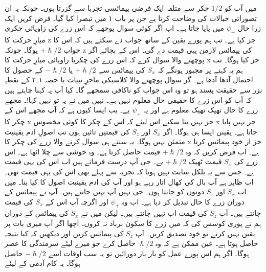 
میں آپ کو 
$1/2$
چکر سے متلقہ ایک فرضی پیمائسی تجربا سے گزرتا ہوں۔ چونکہ یہ ان تصوراتی خیالات کی وضاحت کرتا یے جن پر باب ۱ میں تبصرا کیا گیا۔ فرض کریں ایک زرا حال
$\psi_+$
 میں پایا جاتا ہے۔ اب اگر کوئی سوال پوچھے کہ اس زرے کی زاویائی چکری میارِ حرکت کا 
 z
 جز کیا ہے۔ تب ہم پورے یقین کے ساتھ جواب دے سکتے ہیں کہ اس کا جواب   
 $+\hslash/2$
 یوگا۔ چونکہ 
 z
 کی پیمائس لازمن یہی قیمت دے گی۔ اس کے بجائے اگر پوچھنے والا سوال کرے کہ اس زرے کی چکریا زاویائی میارِ حرکت کا
 x
 جز کیا ہوگا۔ تب ہم یہ کہنے پر مجبور یونگے کہ 
 $S_x$
 کی پیمائس سے 
 $+\hslash/2$
  یا
  $-\hslash/2$
کے حصول کا احتمال آدھا آدھا ہے۔ گر  سوال پوچھنے والا کلاسیکی ماحرِ تبیات یا حصہ ۱۔۲ کے نقطہِ نزر سے حقیقت پسند ہو تو وہ اس جواب کو ناکافی سمجھے گا۔ کیا آپ یہ کہنا چاہتے ہیں کہ آپ کو اس زرے کا حقیقی حال معلوم نہیں ہے۔ نہیں میں نے یہ تو نہیں کہا!۔ مجھے زرے کا حال تھیک تھیک معلوم ہے اور یہ 
$\psi_+$
یے۔ یب ایسا کیوں ہے کہ آپ مجھے اس کے چکر کا 
x
جز نہیں بتا سکتے اس لیئے کہ اس کے چکر کا کوئی مخصوس 
x
جز نہیں پایا جاتا ہے۔ یقینن ایسا ہی ہوگا۔ اگر 
$S_x$
اور
$S_z$
کی قیمتیں تائین ہوں تب اصولِ ادم یقینیت متمئن نہیں ہوگا۔ یہ سنتے ہی سوال کرنے والا زرے کی چکر کا 
x
 جز از خود پیمائس کرتا ہے۔ اب فرض کریں کہ وہ
 $+\hslash/2$
 قیمت حاصل کرتا ہے۔ وہ خوشی سے چلا اٹھا ہے۔ اس زرے کی 
 $S_x$
 قیمت ٹھیک
 $+\hslash/2$
 یے۔ جی آپ درست فرماتے ہیں اب اس کی یہی قیمت ہے۔ جس سے یہ بلکل سابت نہیں ہوتا کہ تجربہ سے پہلے بھی اس کی یہی قیمت تھی۔ اب ظاہر ہے آپ بال کی کھال اتار رہے ہو اور آپ کی ادم یقینیت اصول کا کیا بنا۔ میں اب 
 $S_x$
 اور 
  $S_z$
  دونوں کو جانتا ہوں۔ جی نہیں آپ نہیں جانتے  
ہیں۔ آپ نے پیمائس کے دوران زرے کا حال تبدیل کر دیا ہے۔ اب وہ  
$\psi_+$
اور اگرچہ آپ اس کے 
$S_x$
کی قیمت جانتے ہیں۔ آپ
$S_z$
کی قیمت اب نہیں جانتے ہیں۔ لیکن میں نے 
 $S_x$
 کی پیمائس کے دوران ہم نے پوری کوسس کی کہ میں زرے کا سکون برباد نہ کروں۔ اچھا اگر آپ میری بات پر یقین نہیں کرتے تو خود تصدیق کریں۔ آپ
$S_z$
کی پیمائس کریں اور دیکھیں کہ کیا نتیجہ حاصل ہوتا ہے۔ عین ممکن ہے کہ وہ 
 $\hslash/2$
حاصل کرے جو میرے لیئے سرمندگی کا عصر ہوگا۔ اگر ہم اس پورے عمل کو بار بار دورائیں تو یہ سب اوقات اسے   
$-\hslash/2$
حاصل ہوگا۔ یہ کام آدمی کے لیئے

